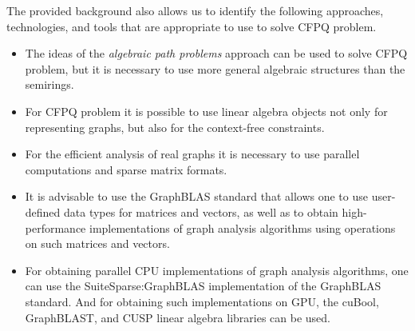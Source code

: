The provided background also allows us to identify the following approaches, technologies, and tools that are appropriate to use to solve CFPQ problem.

\begin{itemize}
    \item The ideas of the \textit{algebraic path problems} approach can be used to solve CFPQ problem, but it is necessary to use more general algebraic structures than the semirings.
    \item For CFPQ problem it is possible to use linear algebra objects not only for representing graphs, but also for the context-free constraints.
    \item For the efficient analysis of real graphs it is necessary to use parallel computations and sparse matrix formats.
	\item It is advisable to use the GraphBLAS standard that allows one to use user-defined data types for matrices and vectors, as well as to obtain high-performance implementations of graph analysis algorithms using operations on such matrices and vectors.
	\item For obtaining parallel CPU implementations of graph analysis algorithms, one can use the SuiteSparse:GraphBLAS implementation of the GraphBLAS standard. And for obtaining such implementations on GPU, the cuBool, GraphBLAST, and CUSP linear algebra libraries can be used.
\end{itemize}


\FloatBarrier
